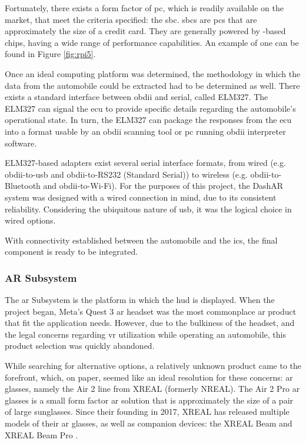             \par Fortunately, there exists a form factor of \gls{pc}, which is readily available on the market, that meet the criteria specified: the \gls{sbc}. \Glspl{sbc} are \glspl{pc} that are approximately the size of a credit card. They are generally powered by -based chips, having a wide range of performance capabilities. An example of one can be found in Figure \ref{fig:rpi5}.

            \par Once an ideal computing platform was determined, the methodology in which the data from the automobile could be extracted had to be determined as well. There exists a standard interface between \gls{obdii} and serial, called ELM327. The ELM327 can signal the \gls{ecu} to provide specific details regarding the automobile's operational state. In turn, the ELM327 can package the responses from the \gls{ecu} into a format usable by an \gls{obdii} scanning tool or \gls{pc} running \gls{obdii} interpreter software.

            \par ELM327-based adapters exist several serial interface formats, from wired (e.g. \gls{obdii}-to-\gls{usb} and \gls{obdii}-to-RS232 (Standard Serial)) to wireless (e.g. \gls{obdii}-to-Bluetooth and \gls{obdii}-to-Wi-Fi). For the purposes of this project, the DashAR system was designed with a wired connection in mind, due to its consistent reliability. Considering the ubiquitous nature of \gls{usb}, it was the logical choice in wired options.

            \par With connectivity established between the automobile and the \gls{ics}, the final component is ready to be integrated.

        \subsubsection{AR Subsystem}
            \par The \gls{ar} Subsystem is the platform in which the \gls{hud} is displayed. When the project began, Meta's Quest 3 \gls{ar} headset was the most commonplace \gls{ar} product that fit the application needs. However, due to the bulkiness of the headset, and the legal concerns regarding \gls{vr} utilization while operating an automobile, this product selection was quickly abandoned.

            \par While searching for alternative options, a relatively unknown product came to the forefront, which, on paper, seemed like an ideal resolution for these concerns: \gls{ar} glasses, namely the Air 2 line from XREAL (formerly NREAL). The Air 2 Pro \gls{ar} glasses is a small form factor \gls{ar} solution that is approximately the size of a pair of large sunglasses. Since their founding in 2017, XREAL has released multiple models of their \gls{ar} glasses, as well as companion devices: the XREAL Beam and XREAL Beam Pro \cite{XREAL2025}.

